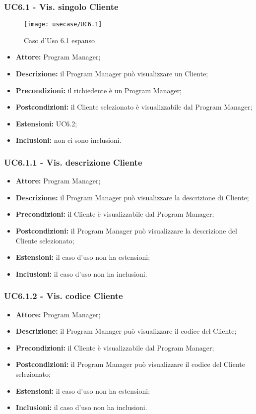 \subsubsection*{UC6.1 - Vis. singolo Cliente}
\begin{figure}[H] 
    \centering 
    \texttt{[image: usecase/UC6.1]} 
    \caption{Caso d'Uso 6.1 espanso}
\end{figure}
\begin{itemize}[label=$\circ$]
\item \textbf{Attore:} Program Manager;
\item \textbf{Descrizione:} il Program Manager può visualizzare un Cliente;
\item \textbf{Precondizioni:} il richiedente è un Program Manager;
\item \textbf{Postcondizioni:} il Cliente selezionato è visualizzabile dal Program Manager;
\item \textbf{Estensioni:} UC6.2;
\item \textbf{Inclusioni:} non ci sono inclusioni.
\end{itemize}

\subsubsection*{UC6.1.1 - Vis. descrizione Cliente}
\begin{itemize}[label=$\circ$]
\item \textbf{Attore:} Program Manager;
\item \textbf{Descrizione:} il Program Manager può visualizzare la descrizione di Cliente;
\item \textbf{Precondizioni:}  il Cliente è visualizzabile dal Program Manager;
\item \textbf{Postcondizioni:} il Program Manager può visualizzare la descrizione del Cliente selezionato;
\item \textbf{Estensioni:} il caso d'uso non ha estensioni;
\item \textbf{Inclusioni:} il caso d'uso non ha inclusioni.
\end{itemize}

\subsubsection*{UC6.1.2 - Vis. codice Cliente}
\begin{itemize}[label=$\circ$]
\item \textbf{Attore:} Program Manager;
\item \textbf{Descrizione:} il Program Manager può visualizzare il codice del Cliente;
\item \textbf{Precondizioni:} il Cliente è visualizzabile dal Program Manager;
\item \textbf{Postcondizioni:} il Program Manager può visualizzare il codice del Cliente selezionato;
\item \textbf{Estensioni:} il caso d'uso non ha estensioni;
\item \textbf{Inclusioni:} il caso d'uso non ha inclusioni.
\end{itemize}
